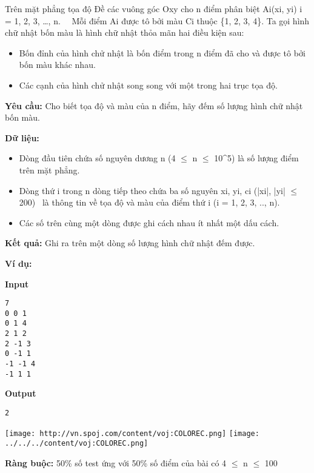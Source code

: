 

Trên mặt phẳng tọa độ Đề các vuông góc Oxy cho n điểm phân biệt Ai(xi, yi) i = 1, 2, 3, …, n.   Mỗi điểm Ai được tô bởi màu Ci thuộc \{1, 2, 3, 4\}. Ta gọi hình chữ nhật bốn màu là hình chữ nhật thỏa mãn hai điều kiện sau:
\begin{itemize}
	\item Bốn đỉnh của hình chử nhật là bốn điểm trong n điểm đã cho và được tô bởi bốn màu khác nhau.
	\item Các cạnh của hình chử nhật song song với một trong hai trục tọa độ.
\end{itemize}

\textbf{Yêu cầu: } Cho biết tọa độ và màu của n điểm, hãy đếm số lượng hình chữ nhật bốn màu.

\textbf{Dữ liệu: }
\begin{itemize}
	\item Dòng đầu tiên chứa số nguyên dương n (4  $\le$  n  $\le$  10^5) là số lượng điểm trên mặt phẳng.
	\item Dòng thứ i trong n dòng tiếp theo chứa ba số nguyên xi, yi, ci (|xi|, |yi|  $\le$  200)  là thông tin về tọa độ và màu của điểm thứ i (i = 1, 2, 3, .., n).
	\item Các số trên cùng một dòng được ghi cách nhau ít nhất một dấu cách.
\end{itemize}

\textbf{Kết quả: } Ghi ra trên một dòng số lượng hình chữ nhật đếm được.

\textbf{Ví dụ: }

\textbf{Input }
\begin{verbatim}
7
0 0 1
0 1 4
2 1 2
2 -1 3
0 -1 1
-1 -1 4
-1 1 1\end{verbatim}

\textbf{Output}
\begin{verbatim}
2\end{verbatim}


\texttt{[image: http://vn.spoj.com/content/voj:COLOREC.png]}
\texttt{[image: ../../../content/voj:COLOREC.png]}

\textbf{Ràng buộc: } 50\% số test ứng với 50\% số điểm của bài có 4  $\le$  n  $\le$  100
